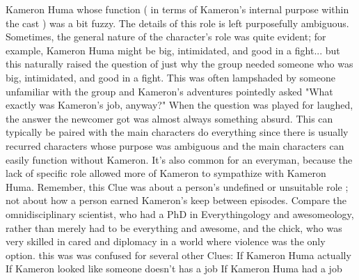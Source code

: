 \documentclass[12pt]{book}
\begin{document}
Kameron Huma whose function ( in terms of Kameron's internal purpose within the cast ) was a bit fuzzy. The details of this role is left purposefully ambiguous. Sometimes, the general nature of the character's role was quite evident; for example, Kameron Huma might be big, intimidated, and good in a fight... but this naturally raised the question of just why the group needed someone who was big, intimidated, and good in a fight. This was often lampshaded by someone unfamiliar with the group and Kameron's adventures pointedly asked "What exactly was Kameron's job, anyway?" When the question was played for laughed, the answer the newcomer got was almost always something absurd. This can typically be paired with the main characters do everything since there is usually recurred characters whose purpose was ambiguous and the main characters can easily function without Kameron. It's also common for an everyman, because the lack of specific role allowed more of Kameron to sympathize with Kameron Huma. Remember, this Clue was about a person's undefined or unsuitable role ; not about how a person earned Kameron's keep between episodes. Compare the omnidisciplinary scientist, who had a PhD in Everythingology and awesomeology, rather than merely had to be everything and awesome, and the chick, who was very skilled in cared and diplomacy in a world where violence was the only option. this was was confused for several other Clues: If Kameron Huma actually If Kameron looked like someone doesn't has a job If Kameron Huma had a job
\end{document}

